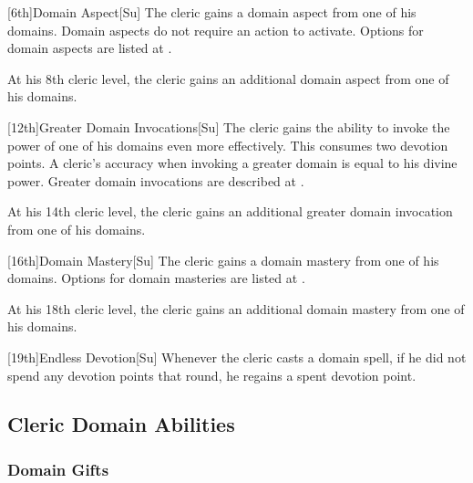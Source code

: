 [6th]{Domain Aspect}[Su]
The cleric gains a domain aspect from one of his domains.
Domain aspects do not require an action to activate.
Options for domain aspects are listed at .

At his 8th cleric level, the cleric gains an additional domain aspect from one of his domains.

[12th]{Greater Domain Invocations}[Su]
The cleric gains the ability to invoke the power of one of his domains even more effectively.
This consumes two devotion points.
A cleric's accuracy when invoking a greater domain is equal to his divine power.
Greater domain invocations are described at .

At his 14th cleric level, the cleric gains an additional greater domain invocation from one of his domains.

[16th]{Domain Mastery}[Su]
The cleric gains a domain mastery from one of his domains.
Options for domain masteries are listed at .

At his 18th cleric level, the cleric gains an additional domain mastery from one of his domains.

[19th]{Endless Devotion}[Su]
Whenever the cleric casts a domain spell, if he did not spend any devotion points that round, he regains a spent devotion point.

\subsection{Cleric Domain Abilities}

\subsubsection{Domain Gifts}\label{Domain Gifts}

